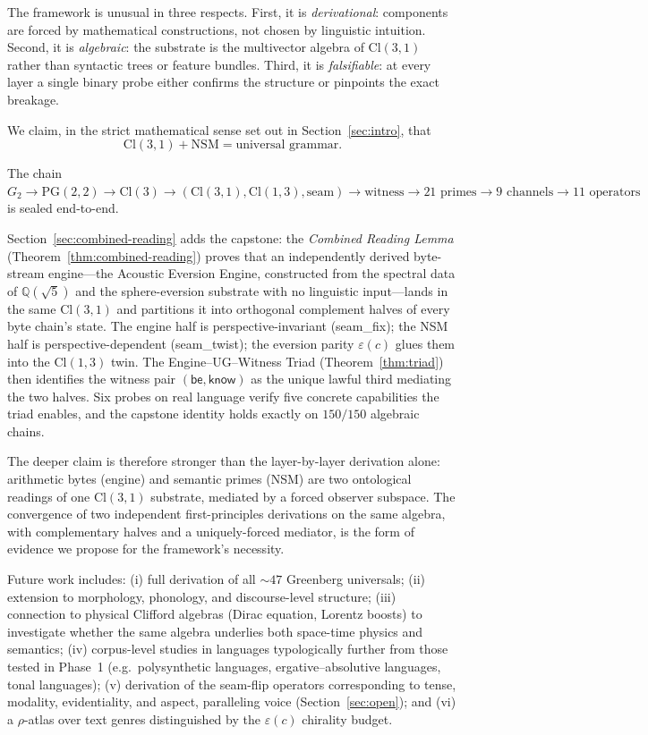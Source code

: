 \documentclass[11pt,a4paper]{article}
\theoremstyle{plain}
\theoremstyle{definition}
\theoremstyle{remark}
\numberwithin{equation}{section}
\providecommand{\Cl}{\mathrm{Cl}}
\providecommand{\PG}{\mathrm{PG}}
\providecommand{\eps}{\varepsilon}
\begin{document}
The framework is unusual in three respects.  First, it is
\emph{derivational}: components are forced by mathematical
constructions, not chosen by linguistic intuition.  Second, it is
\emph{algebraic}: the substrate is the multivector algebra of
$\Cl(3,1)$ rather than syntactic trees or feature bundles.  Third,
it is \emph{falsifiable}: at every layer a single binary probe
either confirms the structure or pinpoints the exact breakage.

We claim, in the strict mathematical sense set out in
Section~\ref{sec:intro}, that
\[
  \boxed{\Cl(3,1) + \mathrm{NSM} = \text{universal grammar.}}
\]

The chain $G_2 \to \PG(2,2) \to \Cl(3) \to (\Cl(3,1), \Cl(1,3),
\text{seam}) \to \text{witness} \to 21 \text{ primes} \to 9
\text{ channels} \to 11 \text{ operators}$ is sealed end-to-end.

Section~\ref{sec:combined-reading} adds the capstone: the
\emph{Combined Reading Lemma} (Theorem~\ref{thm:combined-reading})
proves that an independently derived byte-stream engine---the
Acoustic Eversion Engine, constructed from the spectral data of
$\mathbb{Q}(\sqrt{5})$ and the sphere-eversion substrate with no
linguistic input---lands in the same $\Cl(3,1)$ and partitions it
into orthogonal complement halves of every byte chain's state.
The engine half is perspective-invariant
(\textsf{seam\_fix}); the NSM half is perspective-dependent
(\textsf{seam\_twist}); the eversion parity $\eps(c)$ glues them
into the $\Cl(1,3)$ twin.  The Engine--UG--Witness Triad
(Theorem~\ref{thm:triad}) then identifies the witness pair
$(\mathsf{be}, \mathsf{know})$ as the unique lawful third
mediating the two halves.  Six probes on real language verify five
concrete capabilities the triad enables, and the capstone identity
holds exactly on $150/150$ algebraic chains.

The deeper claim is therefore stronger than the layer-by-layer
derivation alone: arithmetic bytes (engine) and semantic primes
(NSM) are two ontological readings of one $\Cl(3,1)$ substrate,
mediated by a forced observer subspace.  The convergence of two
independent first-principles derivations on the same algebra,
with complementary halves and a uniquely-forced mediator, is the
form of evidence we propose for the framework's necessity.

Future work includes: (i) full derivation of all $\sim 47$
Greenberg universals; (ii) extension to morphology, phonology, and
discourse-level structure; (iii) connection to physical Clifford
algebras (Dirac equation, Lorentz boosts) to investigate whether
the same algebra underlies both space-time physics and semantics;
(iv) corpus-level studies in languages typologically further from
those tested in Phase~1 (e.g.\ polysynthetic languages,
ergative--absolutive languages, tonal languages);
(v) derivation of the seam-flip operators corresponding to tense,
modality, evidentiality, and aspect, paralleling voice
(Section~\ref{sec:open}); and (vi) a $\rho$-atlas over text genres
distinguished by the $\eps(c)$ chirality budget.
\end{document}
